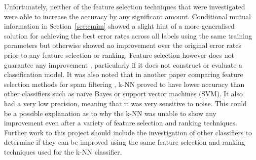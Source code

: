 Unfortunately, neither of the feature selection techniques that were investigated were able to increase the accuracy by any
significant amount. Conditional mutual information in Section~\ref{sec:cmim} showed a slight hint of a more generalised solution
for achieving the best error rates across all labels using the same training parameters but otherwise showed no improvement
over the original error rates prior to any feature selection or ranking. Feature selection however does not guarantee any
improvement \cite{stability_feature_ranking}, particularly if it does not construct or evaluate a classification model. It was
also noted that in another paper comparing feature selection methods for spam filtering \cite{mlmethods_spamfiltering}, k-NN
proved to have lower accuracy than other classifiers such as na\"{i}ve Bayes or support vector machines (SVM). It also had a
very low precision, meaning that it was very sensitive to noise. This could be a possible explanation as to why the k-NN was
unable to show any improvement even after a variety of feature selection and ranking techniques. Further work to this project
should include the investigation of other classifiers to determine if they can be improved using the same feature selection
and ranking techniques used for the k-NN classifier.

%
%
% 
% 
% 
% 
% 